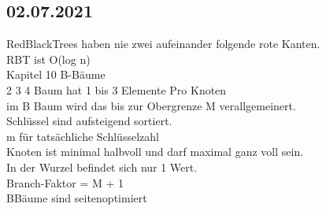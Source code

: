 \documentclass{article}
\begin{document}
	\subsection*{02.07.2021}
	RedBlackTrees haben nie zwei aufeinander folgende rote Kanten. \\
	RBT ist O(log n) \\
	Kapitel 10 B-Bäume \\
	2 3 4 Baum hat 1 bis 3 Elemente Pro Knoten \\
	im B Baum wird das bis zur Obergrenze M verallgemeinert. \\
	Schlüssel sind aufsteigend sortiert. \\
	m für tatsächliche Schlüsselzahl \\
	Knoten ist minimal halbvoll und darf maximal ganz voll sein. \\
	In der Wurzel befindet sich nur 1 Wert. \\
	Branch-Faktor = M + 1 \\
 	BBäume sind seitenoptimiert
	
\end{document}
